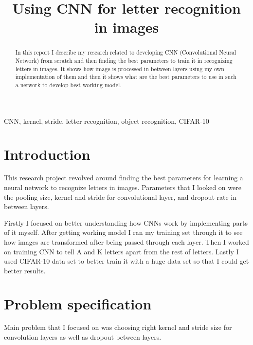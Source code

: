 \documentclass[conference]{IEEEtran}
\begin{document}
\title{Using CNN for letter recognition in images}

\author{
}

\maketitle

\begin{abstract}
In this report I describe my research related to developing CNN (Convolutional Neural Network) from scratch and then finding the best parameters to train it in recognizing letters in images. It shows how image is processed in between layers using my own implementation of them and then it shows what are the best parameters to use in such a network to develop best working model.
\end{abstract}

\begin{IEEEkeywords}
CNN, kernel, stride, letter recognition, object recognition, CIFAR-10
\end{IEEEkeywords}

\section{Introduction}
This research project revolved around finding the best parameters for learning a neural network to recognize letters in images. Parameters that I looked on were the pooling size, kernel and stride for convolutional layer, and dropout rate in between layers.

Firstly I focused on better understanding how CNNs work by implementing parts of it myself. After getting working model I ran my training set through it to see how images are transformed after being passed through each layer. Then I worked on training CNN to tell A and K letters apart from the rest of letters. Lastly I used CIFAR-10 data set to better train it with a huge data set so that I could get better results.

\section{Problem specification}
Main problem that I focused on was choosing right kernel and stride size for convolution layers as well as dropout between layers. 
\end{document}
